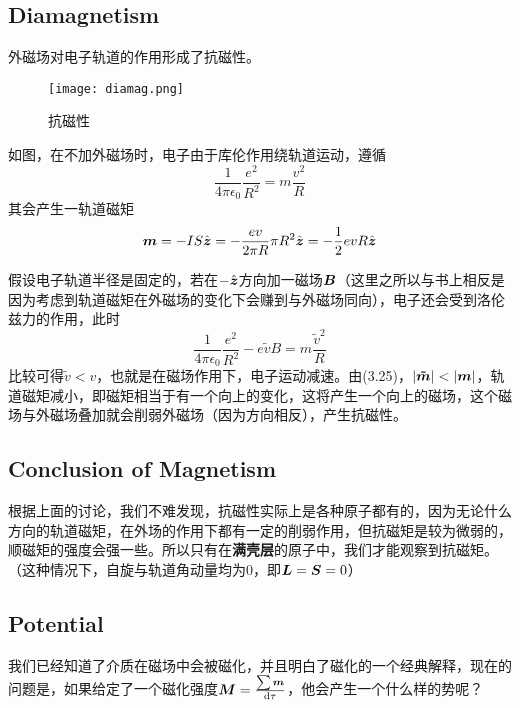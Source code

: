 \documentclass[14pt,oneside]{book}
\begin{document}
\begin{large}
\subsection{Diamagnetism}
外磁场对电子轨道的作用形成了抗磁性。
\begin{figure}[H]
\centering
  \texttt{[image: diamag.png]}
  \caption{抗磁性}
\end{figure}
如图，在不加外磁场时，电子由于库伦作用绕轨道运动，遵循
\begin{equation}
  \frac{1}{4\pi\epsilon_0}\frac{e^2}{R^2}=m\frac{v^2}{R}
\end{equation}
其会产生一轨道磁矩
\begin{equation}
  \vb*{m}=-IS\hat{\vb*{z}}=-\frac{ev}{2\pi R}\pi R^2\hat{\vb*{z}}=-\frac{1}{2}evR\hat{\vb*{z}}
\end{equation}

假设电子轨道半径是固定的，若在$-\hat{\vb*{z}}$方向加一磁场$\vb*{B}$（这里之所以与书上相反是因为考虑到轨道磁矩在外磁场的变化下会赚到与外磁场同向），电子还会受到洛伦兹力的作用，此时
\begin{equation}
  \frac{1}{4\pi\epsilon_0}\frac{e^2}{R^2}-e\tilde{v}B=m\frac{\tilde{v}^2}{R}
\end{equation}
比较可得$\tilde{v}<v$，也就是在磁场作用下，电子运动减速。由(3.25)，$\abs{\vb*{\tilde m}}<\abs{\vb*{m}}$，轨道磁矩减小，即磁矩相当于有一个向上的变化，这将产生一个向上的磁场，这个磁场与外磁场叠加就会削弱外磁场（因为方向相反），产生抗磁性。
\subsection{Conclusion of Magnetism}
根据上面的讨论，我们不难发现，抗磁性实际上是各种原子都有的，因为无论什么方向的轨道磁矩，在外场的作用下都有一定的削弱作用，但抗磁矩是较为微弱的，顺磁矩的强度会强一些。所以只有在\textbf{满壳层}的原子中，我们才能观察到抗磁矩。（这种情况下，自旋与轨道角动量均为0，即$\vb*{L}=\vb*{S}=0$）
\subsection{Potential}
我们已经知道了介质在磁场中会被磁化，并且明白了磁化的一个经典解释，现在的问题是，如果给定了一个磁化强度$\vb*{M}=\frac{\sum \vb*{m}}{\dd \tau}$，他会产生一个什么样的势呢？


\end{large}
\end{document}
